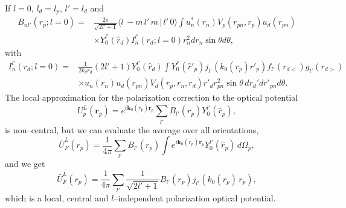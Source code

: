 \documentclass[a4paper,11pt]{article}
\begin{document}
If $l=0$, $l_d=l_p$, $l'=l_d$ and
  \begin{align}\label{eq51}
  \nonumber B_{nl'}(r_p;l=0)=&\frac{2\pi}{\sqrt{2l'+1}}\langle l\,-m\,l'\,m\,|\,l'\,0\rangle\int u_n^*(r_n)V_p(r_{pn},r_p)u_d(r_{pn})\\
  &\times  Y^{l'}_0(\hat r_d) I^{l'}_n(r_d;l=0)r^2_n d r_n \sin\theta d\theta,
  \end{align}
  with
   \begin{align}\label{eq57}
  \nonumber I^{l'}_n(r_d;l=0)=&\frac{1}{2k_dr_d}(2l'+1)Y^{l'}_0(\hat r_d) \int  Y^{l'}_0(\hat r'_p)j_{l'}(k_0(r_p) r'_p)f_{l'}(r_{d<})g_{l'}(r_{d>})\\
  &\times u_n(r_n)u_d(r_{pn}) V_{d}(r_{p},r_n,r_d) r'_dr_{pn}^2\sin\theta\, d r_d'dr'_{pn}d\theta.
   \end{align}
The local approximation for the polarization correction to the optical potential 
 \begin{equation}\label{eq58}
U^L_p(\mathbf r_p)=e^{i\mathbf k_0(r_p)\mathbf r_p}\sum_{l'} B_{l'}(r_p)Y_0^{l'}(\hat r_p),
 \end{equation}
is non--central, but we can evaluate the average over all orientations,
 \begin{equation}\label{eq50}
\bar U^L_F(r_p)=\frac{1}{4\pi}\sum_{l'} B_{l'}(r_p)\int e^{i\mathbf k_0(r_p)\mathbf r_p}Y_0^{l'}(\hat r_p)\,d\Omega_p,
 \end{equation}
 and we get
 \begin{equation}\label{eq70}
 \bar U^L_F(r_p)=\frac{1}{4\pi}\sum_{l'}\frac{1}{\sqrt{2l'+1}} B_{l'}(r_p)j_{l'}(k_0(r_p) \,r_p),
 \end{equation} 
which is a local, central and  $l$--independent polarization optical potential.
\end{document}
